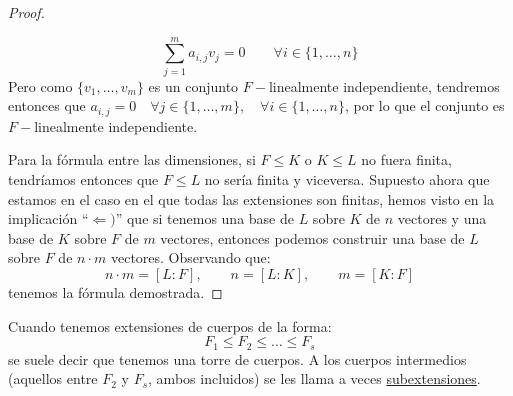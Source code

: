 \begin{lema}[de la Torre]
\begin{proof}
\begin{description}
\begin{itemize}
                        \begin{equation*}
                            \sum\limits_{j=1}^{m}a_{i,j}v_j = 0 \qquad \forall i \in \{1,\ldots,n\}
                        \end{equation*}
                        Pero como $\{v_1,\ldots,v_m\}$ es un conjunto $F-$linealmente independiente, tendremos entonces que $a_{i,j} = 0 \quad \forall j \in \{1,\ldots,m\}, \quad \forall  i \in \{1,\ldots, n\}$, por lo que el conjunto es $F-$linealmente independiente.
                \end{itemize}
        \end{description}
        Para la fórmula entre las dimensiones, si $F\leq K$ o $K\leq L$ no fuera finita, tendríamos entonces que $F\leq L$ no sería finita y viceversa. Supuesto ahora que estamos en el caso en el que todas las extensiones son finitas, hemos visto en la implicación ``$\Longleftarrow )$'' que si tenemos una base de $L$ sobre $K$ de $n$ vectores y una base de $K$ sobre $F$ de $m$ vectores, entonces podemos construir una base de $L$ sobre $F$ de $n\cdot m$ vectores. Observando que:
        \begin{equation*}
            n\cdot m = [L:F], \qquad n = [L:K], \qquad m = [K:F]
        \end{equation*}
        tenemos la fórmula demostrada.
    \end{proof}
\end{lema}

\begin{notacion}
    Cuando tenemos extensiones de cuerpos de la forma:
    \begin{equation*}
        F_1 \leq F_2 \leq \ldots \leq F_s
    \end{equation*}
    se suele decir que tenemos una torre de cuerpos. A los cuerpos intermedios (aquellos entre $F_2$ y $F_s$, ambos incluidos) se les llama a veces \underline{subextensiones}.
\end{notacion}


